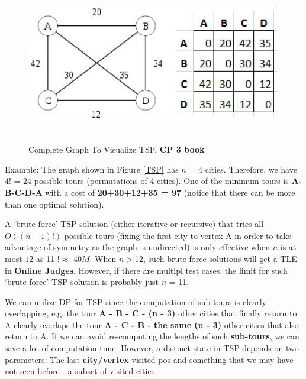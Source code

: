 \begin{figure}[h]
    \centering
\includegraphics[width=14cm, height=7cm]{TSP.png}
 \caption{Complete Graph To Visualize TSP, \textbf{CP 3 book}}
    \label{fig:TSP}
\end{figure}

\hspace{7mm}Example: The graph shown in Figure \ref{TSP} has $n$ = 4 cities. Therefore, we have 4! = 24 possible tours (permutations of 4 cities). One of the minimum tours is \textbf{A-B-C-D-A} with a cost of \textbf{20+30+12+35 = 97} (notice that there can be more than one optimal solution).

\hspace{7mm}A ‘brute force’ TSP solution (either iterative or recursive) that tries all $O((n - 1)!)$ possible tours (fixing the first city to vertex A in order to take advantage of symmetry as the graph is undirected) is only effective when $n$ is at most $12$ as 11 $!$$\approx$ 40$M$. When $n$$>$12, such brute force solutions will
get a TLE in \textbf{Online Judges}. However, if there are multipl test cases, the limit for such ‘brute force’ TSP solution is probably just $n$ = 11.

\hspace{7mm}We can utilize DP for TSP since the computation of sub-tours is clearly overlapping, e.g. the tour \textbf{A - B - C - (n - 3)} other cities that finally return to A clearly overlaps the tour \textbf{A - C - B - the same (n - 3)} other cities that also return to A. If we can avoid re-computing the lengths of such \textbf{sub-tours}, we can save a lot of computation time. However, a distinct state in TSP depends on two parameters: The last \textbf{city/vertex} visited pos and something that we may have not seen before—a subset of visited cities.

